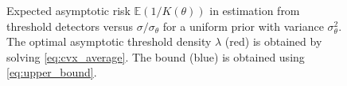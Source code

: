 \documentclass[letterpaper, conference]{IEEEtran}      %
\begin{document}
\begin{figure}
\begin{center}
\caption{Expected asymptotic risk $\mathbb E (1/K(\theta))$ in estimation from threshold detectors versus $\sigma/\sigma_\theta$ for a uniform prior with variance $\sigma_\theta^2$. The optimal asymptotic threshold density $\lambda$ (red) is obtained by solving \eqref{eq:cvx_average}. The bound (blue) is obtained using \eqref{eq:upper_bound}. 
\label{fig:dist_bound_uniform}  }
\end{center}
\end{figure}
\end{document}
